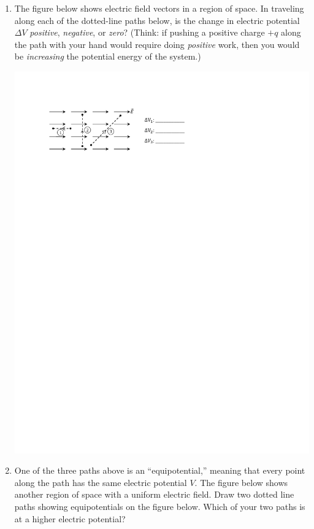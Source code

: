 \begin{enumerate}[labparts]
\pagebreak[3]
\item The figure below shows electric field vectors in a region of space.  In traveling  along each of the dotted-line paths below, is the change in electric potential $\Delta V$ \textit{positive},  \textit{negative}, or  \textit{zero}?  (Think: if pushing a positive charge $+q$ along the path with your hand would require doing \textit{positive} work, then you would  be \textit{increasing} the potential energy of the system.)
\begin{center}
\vspace{-0.1 in}
\includegraphics{potential_intro/activity_5_figs/uniform_E_field_1.pdf}
\end{center}

\item  One of the three paths  above is an ``equipotential,'' meaning that every point along the path has the same electric potential $V$.  The figure below shows another region of space with a uniform electric field.  Draw two dotted line paths showing equipotentials on the figure below.  Which of your two paths is at a higher electric potential?


\end{enumerate}
